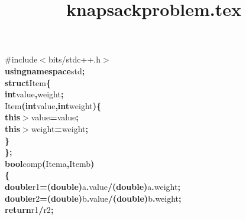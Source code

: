 \documentclass[a4paper, 10pt]{article}
\title{knapsackproblem.tex}
\newcommand\SPC{\hspace*{0.6em}}
\newcommand\TAB{\hspace*{1.2em}}
\newcommand\HYP{\mbox{\char 45}}
\newcommand{\CppAIdentifier}[1]{#1}
\newcommand{\CppAPreprocessor}[1]{\textcolor[rgb]{0,0.5,0}{#1}}
\newcommand{\CppAReservedWord}[1]{\textbf{#1}}
\newcommand{\CppASpace}[1]{\colorbox[rgb]{1,1,1}{#1}}
\newcommand{\CppASymbol}[1]{\textbf{\textcolor[rgb]{1,0,0}{#1}}}
\begin{document}
\begin{ttfamily}
\noindent
\CppAPreprocessor{\#include$<$bits/stdc++.h$>$}\\
\CppAReservedWord{using}\CppASpace{\SPC }\CppAReservedWord{namespace}\CppASpace{\SPC }\CppAIdentifier{std}\CppASymbol{;}\\
\CppAReservedWord{struct}\CppASpace{\SPC }\CppAIdentifier{Item}\CppASymbol{\{}\\
\CppASpace{\TAB }\CppAReservedWord{int}\CppASpace{\SPC }\CppAIdentifier{value}\CppASymbol{,}\CppAIdentifier{weight}\CppASymbol{;}\\
\CppASpace{\TAB }\CppAIdentifier{Item}\CppASymbol{(}\CppAReservedWord{int}\CppASpace{\SPC }\CppAIdentifier{value}\CppASymbol{,}\CppAReservedWord{int}\CppASpace{\SPC }\CppAIdentifier{weight}\CppASymbol{)}\CppASymbol{\{}\\
\CppASpace{\TAB }\CppAReservedWord{this}\CppASymbol{\HYP $>$}\CppAIdentifier{value}\CppASymbol{=}\CppAIdentifier{value}\CppASymbol{;}\\
\CppASpace{\TAB }\CppAReservedWord{this}\CppASymbol{\HYP $>$}\CppAIdentifier{weight}\CppASymbol{=}\CppAIdentifier{weight}\CppASymbol{;}\\
\CppASpace{\TAB }\CppASymbol{\}}\\
\CppASymbol{\}}\CppASymbol{;}\\
\CppAReservedWord{bool}\CppASpace{\SPC }\CppAIdentifier{comp}\CppASymbol{(}\CppAIdentifier{Item}\CppASpace{\SPC }\CppAIdentifier{a}\CppASymbol{,}\CppAIdentifier{Item}\CppASpace{\SPC }\CppAIdentifier{b}\CppASpace{\SPC }\CppASymbol{)}\\
\CppASymbol{\{}\\
\CppASpace{\TAB }\CppAReservedWord{double}\CppASpace{\SPC }\CppAIdentifier{r1}\CppASymbol{=}\CppASymbol{(}\CppAReservedWord{double}\CppASymbol{)}\CppAIdentifier{a}\CppASymbol{.}\CppAIdentifier{value}\CppASymbol{/}\CppASymbol{(}\CppAReservedWord{double}\CppASymbol{)}\CppAIdentifier{a}\CppASymbol{.}\CppAIdentifier{weight}\CppASymbol{;}\\
\CppASpace{\TAB }\CppAReservedWord{double}\CppASpace{\SPC }\CppAIdentifier{r2}\CppASymbol{=}\CppASymbol{(}\CppAReservedWord{double}\CppASymbol{)}\CppAIdentifier{b}\CppASymbol{.}\CppAIdentifier{value}\CppASymbol{/}\CppASymbol{(}\CppAReservedWord{double}\CppASymbol{)}\CppAIdentifier{b}\CppASymbol{.}\CppAIdentifier{weight}\CppASymbol{;}\\
\CppASpace{\TAB }\CppAReservedWord{return}\CppASpace{\SPC }\CppAIdentifier{r1}\CppASymbol{/}\CppAIdentifier{r2}\CppASymbol{;}\\

\end{ttfamily}
\end{document}
